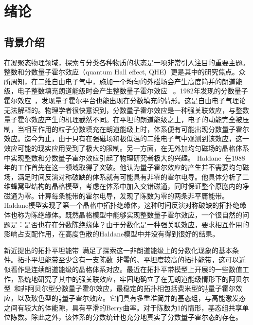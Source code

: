 \chapter{绪论}
\label{introduction}

\section{背景介绍}
在凝聚态物理领域，探索与分类各种物质的状态是一项非常引人注目的重要主题。整数和分数量子霍尔效应（quantum Hall effect, QHE）更是其中的研究焦点。众所周知，在二维自由电子气中，施加一个均匀的外磁场会产生高度简并的朗道能级，电子整数填充朗道能级时会产生整数量子霍尔效应~\cite{Klitzing1980} 。1982年发现的分数量子霍尔效应~\cite{Tsui1982}，发现量子霍尔平台也能出现在分数填充的情形。这是自由电子气理论无法解释的。物理学者很快意识到，分数量子霍尔效应是一种强关联效应，与整数量子霍尔效应产生的机理截然不同。在平坦的朗道能级之上，电子的动能完全被压制，当相互作用的粒子分数填充在朗道能级上时，体系便有可能出现分数量子霍尔效应。迄今为止，由于只有在强磁场和极低温的二维电子气中观测到该效应，这一效应可能的现实应用受到了极大的限制。另一方面，在无外加均匀磁场的晶格体系中实现整数和分数量子霍尔效应引起了物理研究者极大的兴趣。
Haldane~\cite{Haldane1988}在1988年的工作首先在这一领域取得了突破。他认为量子霍尔效应的产生并不需要均匀磁场，满足时间反演对称破缺的体系就有可能具有非零的霍尔电导。他具体分析了二维蜂窝型结构的晶格模型，考虑在体系中加入交错磁通，同时保证整个原胞内的净磁通为零。计算每条能带的霍尔电导，发现了陈数为零的两条非平庸能带。Haldane模型实现了第一个晶格中拓扑绝缘体，这种时间反演对称破缺的拓扑绝缘体也称为陈绝缘体。既然晶格模型中能够实现整数量子霍尔效应，一个很自然的问题是：是否也存在分数陈绝缘体？由于分数化是一种强关联效应，要求相互作用的影响占支配作用，在高度色散的Haldane模型中并没有得到很好的结果。

新近提出的拓扑平坦能带~\cite{Tang2011,Sun2011,Neupert2011}满足了探索这一非朗道能级上的分数化现象的基本条件。拓扑平坦能带至少含有一支陈数~\cite{Thouless1982}非零的、平坦度较高的拓扑能带，这可以近似看作是连续朗道能级的晶格体系对应。最近在拓扑平带模型上开展的一些数值工作，系统地研究了其中的强关联效应，牢固地确立了在无朗道能级情形下的阿贝尔型~\cite{Sheng2011,Wang2011,Regnault2011}和非阿贝尔型分数量子霍尔效应\cite{Wang2012a,Bernevig2012,Wu2012}，最稳定的拓扑相包括费米型的$\frac{1}{3}$量子霍尔效应，以及玻色型的$\frac{1}{2}$量子霍尔效应。它们具有多重准简并的基态组，与高能激发态之间有较大的体能隙，具有平滑的Berry曲率。对于陈数为1的情形，基态组共享单位陈数。除此之外，该体系的分数统计也充分地真实了分数量子霍尔态的存在。

